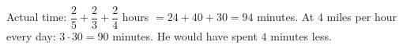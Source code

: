 Actual time: $\dfrac25+\dfrac23+\dfrac24$ hours $=24+40+30=94$ minutes. At $4$ miles per hour every day: $3\cdot30=90$ minutes. He would have spent $\boxed{4}$ minutes less.
